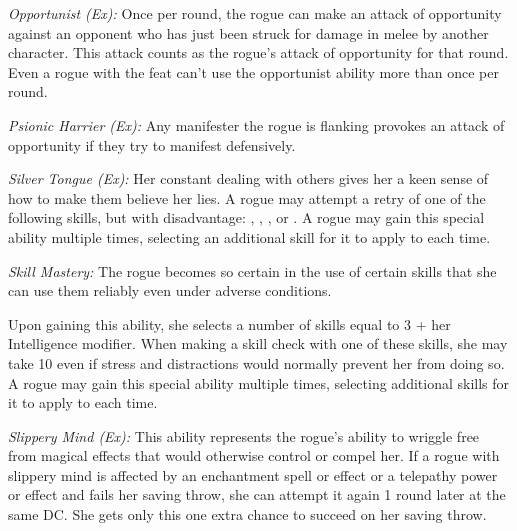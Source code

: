 

\textit{Opportunist (Ex):} Once per round, the rogue can make an attack of opportunity against an opponent who has just been struck for damage in melee by another character. This attack counts as the rogue's attack of opportunity for that round. Even a rogue with the  feat can't use the opportunist ability more than once per round.

\textit{Psionic Harrier (Ex):} Any manifester the rogue is flanking provokes an attack of opportunity if they try to manifest defensively.

\textit{Silver Tongue (Ex):} Her constant dealing with others gives her a keen sense of how to make them believe her lies. A rogue may attempt a retry of one of the following skills, but with disadvantage: , , , or . A rogue may gain this special ability multiple times, selecting an additional skill for it to apply to each time.

\textit{Skill Mastery:} The rogue becomes so certain in the use of certain skills that she can use them reliably even under adverse conditions.

Upon gaining this ability, she selects a number of skills equal to 3 + her Intelligence modifier. When making a skill check with one of these skills, she may take 10 even if stress and distractions would normally prevent her from doing so. A rogue may gain this special ability multiple times, selecting additional skills for it to apply to each time.

\textit{Slippery Mind (Ex):} This ability represents the rogue's ability to wriggle free from magical effects that would otherwise control or compel her. If a rogue with slippery mind is affected by an enchantment spell or effect or a telepathy power or effect and fails her saving throw, she can attempt it again 1 round later at the same DC. She gets only this one extra chance to succeed on her saving throw.

